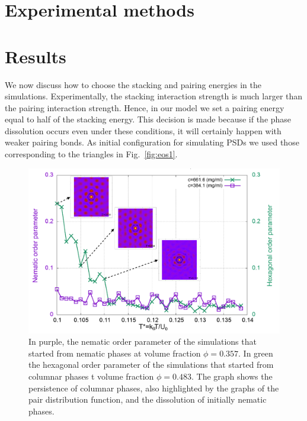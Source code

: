 \documentclass[aip,jcp, amsmath, amssymb, reprint]{revtex4-1}
\begin{document}
\section{\label{exp}Experimental methods}

\section{\label{Results}Results}
We now discuss how to choose the stacking and pairing energies in the simulations. Experimentally, the stacking interaction
strength is much larger than the pairing interaction strength. 
Hence, in our model we set a pairing energy equal to half of the stacking energy.
This decision is made because if the phase dissolution occurs even under these conditions,
it will certainly happen with weaker pairing bonds. 
As initial configuration for simulating PSDs we used those corresponding to the triangles in Fig.~\ref{fig:eos1}.
\begin{figure}[h!]
\includegraphics[width=0.99\linewidth]{par.png}
\caption{\label{fig:par} In purple, the nematic order parameter of the simulations that started from nematic phases at volume fraction $\phi=0.357$. In green the hexagonal order parameter of the simulations that started from columnar phases t volume fraction $\phi=0.483$. The graph shows the persistence of columnar phases, also highlighted by the graphs of the pair distribution function, and the dissolution of initially nematic phases.}
\end{figure}
\end{document}
